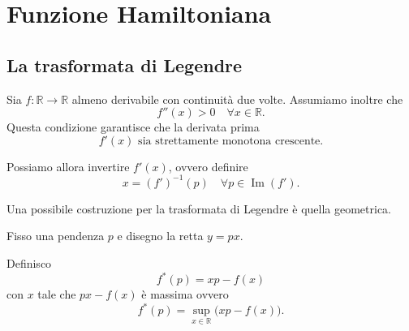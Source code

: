 \chapter{Funzione Hamiltoniana}
\section{La trasformata di Legendre}

Sia \(f:\mathbb{R}\longrightarrow\mathbb{R}\) almeno derivabile con continuità due volte. Assumiamo inoltre che
\[
f''(x)>0 \quad \forall x\in\mathbb{R}.
\]
Questa condizione garantisce che la derivata prima
\[
f'(x) \text{ sia strettamente monotona crescente}.
\]

Possiamo allora invertire \(f'(x)\), ovvero definire
\[
x=(f')^{-1}(p) \quad \forall p\in \operatorname{Im}(f').
\]

Una possibile costruzione per la trasformata di Legendre è quella geometrica.

Fisso una pendenza \(p\) e disegno la retta \(y=px\).

\begin{center}
\end{center}

Definisco
\[
f^*(p)=xp-f(x)
\]
con \(x\) tale che \(px-f(x)\) è massima ovvero
\[
f^*(p)=\sup_{x\in\mathbb{R}}\bigl(xp-f(x)\bigr).
\]

